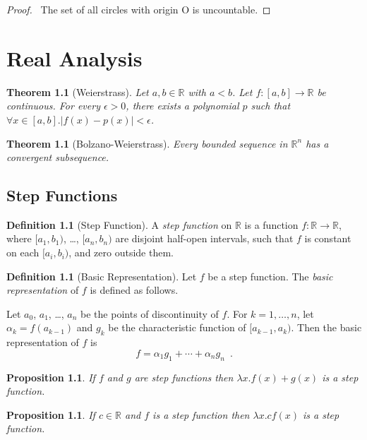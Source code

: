 \documentclass{book}
\let\qed\relax
\newtheorem{prop}[ax]{Proposition}
\newtheorem{thm}[ax]{Theorem}
\theoremstyle{definition}
\newtheorem{df}[ax]{Definition}
\begin{document}
\begin{proof}
\pf\ The set of all circles with origin O is uncountable. \qed
\end{proof}

\chapter{Real Analysis}

\begin{thm}[Weierstrass]
Let $a,b \in \mathbb{R}$ with $a < b$. Let $f : [a,b] \rightarrow \mathbb{R}$ be continuous. For every $\epsilon > 0$, there exists a polynomial $p$ such that $\forall x \in [a,b]. |f(x) - p(x)| < \epsilon$.
\end{thm}


\begin{thm}[Bolzano-Weierstrass]
Every bounded sequence in $\mathbb{R}^n$ has a convergent subsequence.
\end{thm}

\section{Step Functions}

\begin{df}[Step Function]
A \emph{step function} on $\mathbb{R}$ is a function $f : \mathbb{R} \rightarrow \mathbb{R}$, where $[a_1,b_1)$, \ldots, $[a_n,b_n)$ are disjoint half-open intervals, such that $f$ is constant on each $[a_i,b_i)$, and zero outside them.
\end{df}

\begin{df}[Basic Representation]
Let $f$ be a step function. The \emph{basic representation} of $f$ is defined as follows.

Let $a_0$, $a_1$, \ldots, $a_n$ be the points of discontinuity of $f$. For $k = 1, \ldots, n$, let $\alpha_k = f(a_{k-1})$ and $g_k$ be the characteristic function of $[a_{k-1},a_k)$. Then the basic representation of $f$ is
\[ f = \alpha_1 g_1 + \cdots + \alpha_n g_n \enspace . \]
\end{df}

\begin{prop}
If $f$ and $g$ are step functions then $\lambda x.f(x) + g(x)$ is a step function.
\end{prop}

\begin{prop}
If $c \in \mathbb{R}$ and $f$ is a step function then $\lambda x. cf(x)$ is a step function.
\end{prop}
\end{document}
